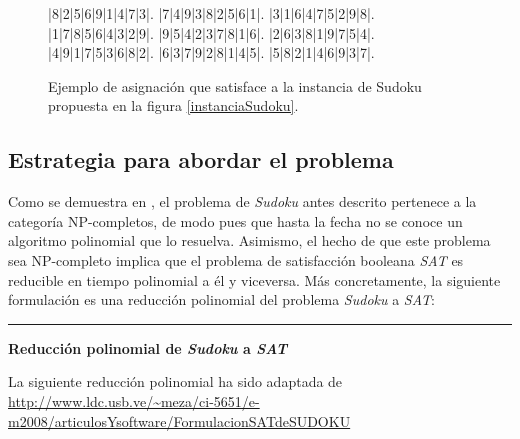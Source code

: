 \documentclass[12pt,lettersize,oneside]{article}
\begin{document}
\begin{figure}\caption{Ejemplo de asignación que satisface a la instancia de
    Sudoku propuesta en la figura \ref{instanciaSudoku}.}
\label{solSudoku}
\setlength\sudokusize{6.5cm}
\begin{sudoku}
|8|2|5|6|9|1|4|7|3|.
|7|4|9|3|8|2|5|6|1|.
|3|1|6|4|7|5|2|9|8|.
|1|7|8|5|6|4|3|2|9|.
|9|5|4|2|3|7|8|1|6|.
|2|6|3|8|1|9|7|5|4|.
|4|9|1|7|5|3|6|8|2|.
|6|3|7|9|2|8|1|4|5|.
|5|8|2|1|4|6|9|3|7|.
\end{sudoku}
\end{figure}

\vspace{-2.5mm}

\subsection{Estrategia para abordar el problema}

Como se demuestra en \cite{YatoSeta}, el problema de \emph{Sudoku} antes
descrito pertenece a la categoría NP-completos, de modo pues que hasta la fecha
no se conoce un algoritmo polinomial que lo resuelva. Asimismo, el hecho de que
este problema sea NP-completo implica que el problema de satisfacción booleana
\emph{SAT} es reducible en tiempo polinomial a él y viceversa. Más
concretamente, la siguiente formulación es una reducción polinomial del problema
\emph{Sudoku} a \emph{SAT}:

\rule{4cm}{0.3mm}

\textbf{Reducción polinomial de \emph{Sudoku} a \emph{SAT} }

La siguiente reducción polinomial ha sido adaptada de 
\url{http://www.ldc.usb.ve/~meza/ci-5651/e-m2008/articulosYsoftware/FormulacionSATdeSUDOKU}
\end{document}
